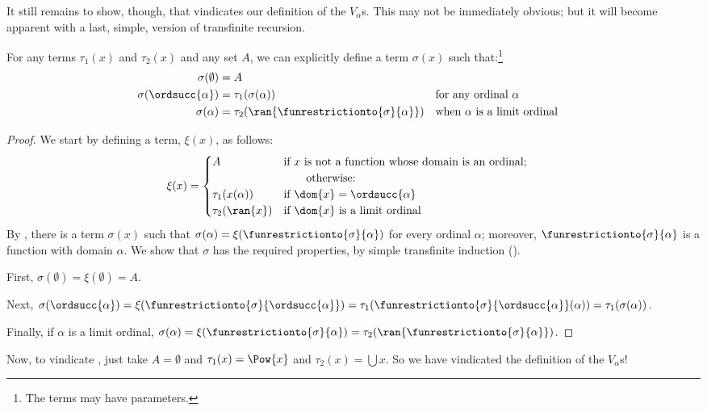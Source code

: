 \documentclass[../../../include/open-logic-section]{subfiles}
\begin{document}
It still remains to show, though, that  vindicates our definition of the $V_\alpha$s. This may not be immediately obvious; but it will become apparent with a last, simple, version of transfinite recursion.
\begin{thm} For any terms $\tau_1(x)$ and $\tau_2(x)$ and any set $A$, we can explicitly define a term $\sigma(x)$ such that:\footnote{The terms may have parameters.}
	\begin{align*}
		\sigma(\emptyset) &= A\\
		\sigma(\ordsucc{\alpha}) &= \tau_1(\sigma(\alpha)) &&\text{for any ordinal }\alpha\\
		\sigma(\alpha) &= \tau_2(\ran{\funrestrictionto{\sigma}{\alpha}})&&\text{when }\alpha\text{ is a limit ordinal}
	\end{align*}
\end{thm}
\begin{proof}
	We start by defining a term, $\xi(x)$, as follows: %
	\begin{align*}
		\xi(x) &= 
		\begin{cases}
			A&\text{if }x\text{ is not a function whose domain is an ordinal;}\\
			&\hspace{2em}\text{otherwise:}\\
			\tau_1(x(\alpha))&\text{if }\dom{x} = \ordsucc{\alpha}\\
			\tau_2(\ran{x})&\text{if }\dom{x}\text{ is a limit ordinal}
		\end{cases}
	\end{align*}
	By , there is a term $\sigma(x)$ such that $\sigma(\alpha) = \xi(\funrestrictionto{\sigma}{\alpha})$ for every ordinal $\alpha$; moreover, $\funrestrictionto{\sigma}{\alpha}$ is a function with domain $\alpha$. We show that $\sigma$ has the required properties, by simple transfinite induction (). 
	
	First, $\sigma(\emptyset) = \xi(\emptyset) = A$. 
	
	Next, $\sigma(\ordsucc{\alpha}) = \xi(\funrestrictionto{\sigma}{\ordsucc{\alpha}}) = \tau_1(\funrestrictionto{\sigma}{\ordsucc{\alpha}}(\alpha)) = \tau_1(\sigma(\alpha))$.
	
	Finally, if $\alpha$ is a limit ordinal, $\sigma(\alpha) = \xi(\funrestrictionto{\sigma}{\alpha}) = \tau_2(\ran{\funrestrictionto{\sigma}{\alpha}})$. %
\end{proof}\noindent
Now, to vindicate , just take $A = \emptyset$ and $\tau_1(x) = \Pow{x}$ and $\tau_2(x) = \bigcup x$. So we have vindicated the definition of the $V_\alpha$s!
\end{document}
